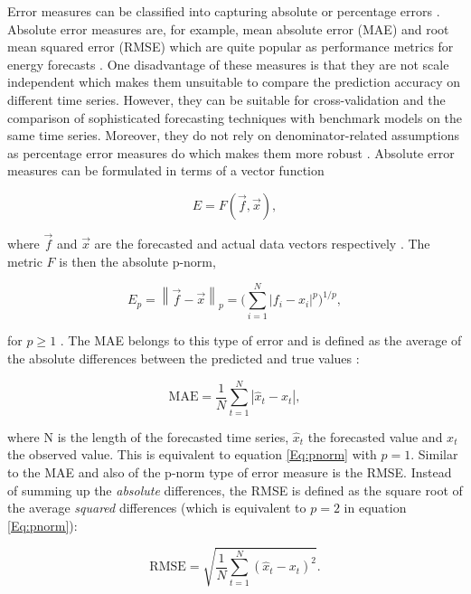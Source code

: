 Error measures can be classified into capturing absolute or percentage errors \citep{Hoff:2013}. Absolute error measures are, for example, mean absolute error (MAE) and root mean squared error (RMSE) which are quite popular as performance metrics for energy forecasts \citet{zor:2017}. One disadvantage of these measures is that they are not scale independent which makes them unsuitable to compare the prediction accuracy on different time series. However, they can be suitable for cross-validation and the comparison of sophisticated forecasting techniques with benchmark models on the same time series. Moreover, they do not rely on denominator-related assumptions as percentage error measures do which makes them more robust \citep{Hoff:2013}. Absolute error measures can be formulated in terms of a vector function 

\begin{equation} \label{Eq:vectorfunction}
    E=F\left(\vec{f}, \vec{x}\right),
\end{equation}

\noindent where $\vec{f}$ and $\vec{x}$ are the forecasted and actual data vectors respectively \citep{Haben:2014}. The metric $F$ is then the absolute p-norm,

\begin{equation} \label{Eq:pnorm}
    E_p=\left\lVert\vec{f}-\vec{x}\right\rVert_p=\biggl(\sum_{i=1}^N \left|f_i-x_i\right|^p\biggr)^{1/p},
\end{equation}

\noindent for $p≥1$ \citep[][p. 52]{golub:2012}. The MAE belongs to this type of error and is defined as the average of the absolute differences between the predicted and true values \citet{Hoff:2013}:

\begin{equation} \label{Eq:MAE}
\text{MAE}=\frac{1}{N}\sum_{t=1}^N\left|\widehat{x}_t-x_t\right|,    
\end{equation}

\noindent where N is the length of the forecasted time series, $\widehat{x}_t$ the forecasted value and $x_t$ the observed value. This is equivalent to equation \ref{Eq:pnorm} with $p=1$. Similar to the MAE and also of the p-norm type of error measure is the RMSE. Instead of summing up the \textit{absolute} differences, the RMSE is defined as the square root of the average \textit{squared} differences (which is equivalent to $p=2$ in equation \ref{Eq:pnorm}):

\begin{equation} \label{Eq:RMSE}
\text{RMSE}=\sqrt{\frac{1}{N}\sum_{t=1}^N\left(\widehat{x}_t-x_t\right)^2}.
\end{equation}

